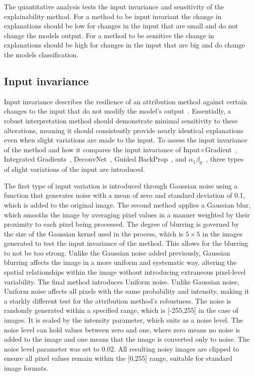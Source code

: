 The quantitative analysis tests the input invariance and sensitivity of the explainability method. For a method to be input invariant the change in explanations should be low for changes in the input that are small and do not change the models output. For a method to be sensitive the change in explanations should be high for changes in the input that are big and do change the models classification.

\subsection{Input invariance}
\label{input_inv}
Input invariance describes the resilience of an attribution method against certain changes to the input that do not modify the model's output~\cite{YehHSIR19}. Essentially, a robust interpretation method should demonstrate minimal sensitivity to these alterations, meaning it should consistently provide nearly identical explanations even when slight variations are made to the input. To assess the input invariance of the \CTC\/ method and how it compares the input invariance of Input$\times$Gradient~\cite{SimonyanVZ13}, Integrated Gradients~\cite{SundararajanTY17}, DeconvNet~\cite{ZeilerKTF10}, Guided BackProp~\cite{SpringenbergDBR14}, and \LRP\-$\alpha_1\beta_0$~\cite{bach2015pixel}, three types of slight variations of the input are introduced.


The first type of input variation is introduced through Gaussian noise using a function that generates noise with a mean of zero and standard deviation of 0.1, which is added to the original image. The second method applies a Gaussian blur, which smooths the image by averaging pixel values in a manner weighted by their proximity to each pixel being processed. The degree of blurring is governed by the size of the Gaussian kernel used in the process, which is $5 \times 5$ in the images generated to test the input invariance of the method. This allows for the blurring to not be too strong. Unlike the Gaussian noise added previously, Gaussian blurring affects the image in a more uniform and systematic way, altering the spatial relationships within the image without introducing extraneous pixel-level variability. The final method introduces Uniform noise. Unlike Gaussian noise, Uniform noise affects all pixels with the same probability and intensity, making it a starkly different test for the attribution method's robustness. The noise is randomly generated within a specified range, which is [-255,255] in the case of images. It is scaled by the intensity parameter, which suits as a noise level. The noise level can hold values between zero and one, where zero means no noise is added to the image and one means that the image is converted only to noise. The noise level parameter was set to 0.02. All resulting noisy images are clipped to ensure all pixel values remain within the [0,255] range, suitable for standard image formats.

